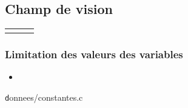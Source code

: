 \subsection{Champ de vision}
\begin{center}
	\begin{tabular}{rcl}
	 & \\
	\end{tabular}
\end{center}
%
%
%
\subsubsection{Limitation des valeurs des variables}
%

\begin{itemize}[label=, leftmargin=2cm]
\item 
\end{itemize}
%
{\texttt donnees/constantes.c}
%
